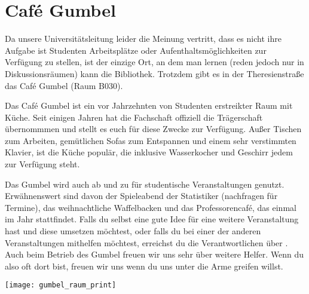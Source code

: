 ﻿
\chapter{Café Gumbel}

Da unsere Universitätsleitung leider die Meinung vertritt, dass es nicht ihre
Aufgabe ist Studenten  Arbeitsplätze oder Aufenthaltsmöglichkeiten zur Verfügung
zu stellen, ist der einzige Ort, an dem man lernen (reden jedoch nur in
Diskussionsräumen) kann die Bibliothek. Trotzdem gibt es in der Theresienstraße
das Café Gumbel (Raum B030).

Das Café Gumbel ist ein vor Jahrzehnten von Studenten erstreikter Raum mit
Küche. Seit einigen Jahren hat die Fachschaft offiziell die Trägerschaft
übernommmen und stellt es euch für diese Zwecke zur Verfügung. Außer
Tischen zum Arbeiten, gemütlichen Sofas zum Entspannen und einem sehr
verstimmten Klavier, ist die Küche populär, die inklusive Wasserkocher und
Geschirr jedem zur Verfügung steht.

Das Gumbel wird auch ab und zu für studentische Veranstaltungen genutzt.
Erwähnenswert sind davon der Spieleabend der Statistiker (nachfragen für
Termine), das weihnachtliche Waffelbacken und das Professorencafé, das einmal
im Jahr stattfindet.  Falls du selbst eine gute Idee für eine weitere
Veranstaltung hast und diese umsetzen möchtest, oder falls du bei einer der anderen
Veranstaltungen mithelfen möchtest, erreichst du die Verantwortlichen über
. Auch beim Betrieb des Gumbel freuen wir uns sehr über
weitere Helfer. Wenn du also oft dort bist, freuen wir uns wenn du uns unter
die Arme greifen willst.

\skiptobottom
\begin{center}
     \texttt{[image: gumbel\_raum\_print]}
\end{center}
